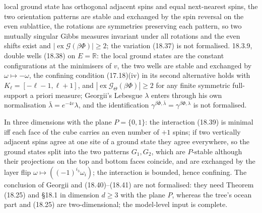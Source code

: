 \begin{example}
    local ground state has orthogonal adjacent spins and equal next-nearest spins, the two
    orientation patterns are stable and exchanged by the spin reversal on the even sublattice, the
    rotations are symmetries preserving each pattern, so two mutually singular Gibbs measures
    invariant under all rotations and the even shifts exist and $|\operatorname{ex}\mathcal
    G(\beta\Phi)| \geq 2$; the variation (18.37) is not formalised. 18.3.9, double wells (18.38) on
    $E = \mathbb R$: the local ground states are the constant configurations at the minimisers of
    $v$, the two wells are stable and exchanged by $\omega \mapsto -\omega$, the confining condition
    (17.18)(iv) in its second alternative holds with $K_\ell = [-\ell-1, \ell+1]$, and
    $|\operatorname{ex}\mathcal G_\Theta(\beta\Phi)| \geq 2$ for any finite symmetric full-support a
    priori measure; Georgii's Lebesgue $\lambda$ enters through his own normalisation
    $\bar\lambda = e^{-4v}\lambda$, and the identification $\gamma^{\beta\bar\Phi,\bar\lambda} =
    \gamma^{\beta\Phi,\lambda}$ is not formalised.
\end{example}

\begin{example}
    \label{ex:dse-slawny}
    \leanok

    In three dimensions with the plane $P = \{0,1\}$: the interaction (18.39) is minimal iff each
    face of the cube carries an even number of $+1$ spins; if two vertically adjacent spins agree
    at one site of a ground state they agree everywhere, so the ground states split into the two
    patterns $G_1, G_2$, which are $P$-stable although their projections on the top and bottom
    faces coincide, and are exchanged by the layer flip $\omega \mapsto ((-1)^{i_3}\omega_i)$; the
    interaction is bounded, hence confining. The conclusion of Georgii and (18.40)--(18.41) are not
    formalised: they need Theorem (18.25) and \S18.1 in dimension $d \geq 3$ with the plane $P$,
    whereas the tree's ocean part and (18.25) are two-dimensional; the model-level input is complete.
\end{example}
